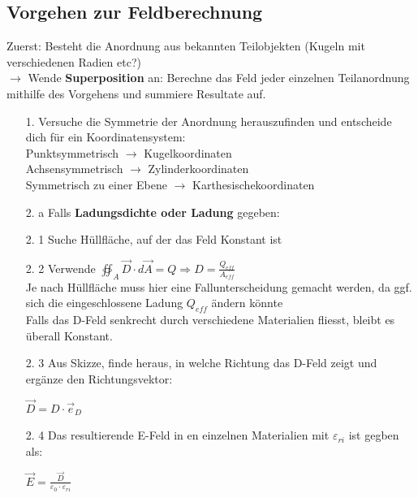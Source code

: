 \subsection{Vorgehen zur Feldberechnung}
\beginvor
Zuerst: Besteht die Anordnung aus bekannten Teilobjekten (Kugeln mit verschiedenen Radien etc?) \\
$\rightarrow$ Wende \textbf{Superposition} an: Berechne das Feld jeder einzelnen Teilanordnung mithilfe des Vorgehens und summiere Resultate auf.
\\
\begin{itemize}

	\item [1. ] Versuche die Symmetrie der Anordnung herauszufinden und entscheide dich für ein Koordinatensystem: \\
	Punktsymmetrisch $\rightarrow$ Kugelkoordinaten \\
	Achsensymmetrisch $\rightarrow$ Zylinderkoordinaten \\
	Symmetrisch zu einer Ebene $\rightarrow$ Karthesischekoordinaten\\

	\item [2. a]Falls \textbf{Ladungsdichte oder Ladung} gegeben: \\
\end{itemize}
	\beginip
	\begin{itemize}

	\item [2. 1]  Suche Hüllfläche, auf der das Feld Konstant ist


	\item [2. 2] Verwende $\displaystyle \oiint_A \vec{D} \cdot d\vec{A} = Q \Rightarrow D = \frac{Q_{eff}}{A_{eff}}$ \\
	Je nach Hüllfläche muss hier eine Fallunterscheidung gemacht werden, da ggf. sich die eingeschlossene Ladung $Q_{eff}$ ändern könnte\\
	Falls das D-Feld senkrecht durch verschiedene Materialien fliesst, bleibt es überall Konstant.

	\item [2. 3] Aus Skizze, finde heraus, in welche Richtung das D-Feld zeigt und ergänze den Richtungsvektor:
	\begin{center}
		$\vec{D} = D \cdot \vec{e}_D$
	\end{center}

	\item [2. 4] Das resultierende E-Feld in en einzelnen Materialien mit $\varepsilon_{ri}$ ist gegben als:
	\begin{center}
			$\displaystyle \vec{E} = \frac{\vec{D}}{\varepsilon_0 \cdot \varepsilon_{ri}}$
	\end{center}
\end{itemize}
